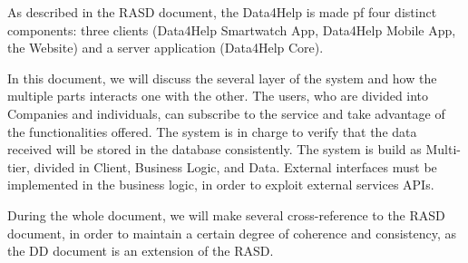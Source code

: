 As described in the RASD document, the Data4Help is made pf four distinct components: three clients (Data4Help Smartwatch App, Data4Help Mobile App, the Website) and a server application (Data4Help Core).

In this document, we will discuss the several layer of the system and how the multiple parts interacts one with the other. 
The users, who are divided into Companies and individuals, can subscribe to the service and take advantage of the functionalities offered.
The system is in charge to verify that the data received will be stored in the database consistently.
The system is build as Multi-tier, divided in Client, Business Logic, and Data. External interfaces must be implemented in the business logic, in order to exploit external services APIs.

During the whole document, we will make several cross-reference to the RASD document, in order to maintain a certain degree of coherence and consistency, as the DD document is an extension of the RASD.

